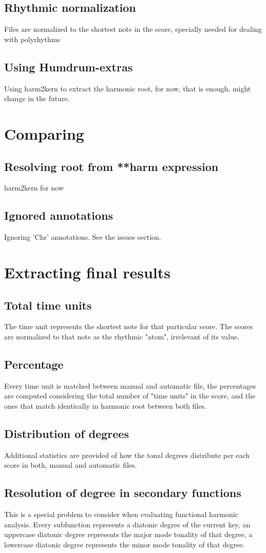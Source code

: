   \subsection{Rhythmic normalization}
  Files are normalized to the shortest note in the score, specially needed for dealing with polyrhythms
	\subsection{Using Humdrum-extras}
  Using harm2kern to extract the harmonic root, for now, that is enough, might change in the future.
\section{Comparing}
	\subsection{Resolving root from **harm expression}
  harm2kern for now
	\subsection{Ignored annotations}
  Ignoring 'Chr' annotations. See the issues section.
\section{Extracting final results}
	\subsection{Total time units}
  The time unit represents the shortest note for that particular score. The scores are normalized to that note as the rhythmic "atom", irrelevant of its value.
	\subsection{Percentage}
  Every time unit is matched between manual and automatic file, the percentages are computed considering the total number of "time units" in the score, and the ones that match identically in harmonic root between both files.
	\subsection{Distribution of degrees}
  Additional statistics are provided of how the tonal degrees distribute per each score in both, manual and automatic files.
	\subsection{Resolution of degree in secondary functions}
  This is a special problem to consider when evaluating functional harmonic analysis. Every subfunction represents a diatonic degree of the current key, an uppercase diatonic degree represents the major mode tonality of that degree, a lowercase diatonic degree represents the minor mode tonality of that degree.

\newpage
